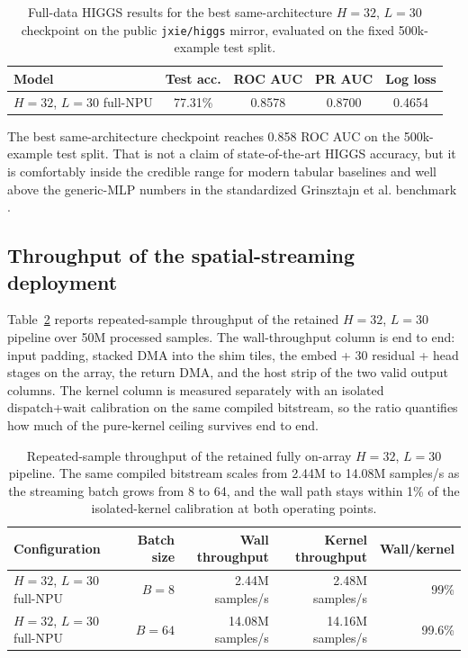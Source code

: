 \documentclass[a4paper,11pt]{article}
\newcommand{\code}[1]{\texttt{#1}}
\begin{document}
\begin{table}[t]
\centering
\footnotesize
\begin{tabular}{@{}lcccc@{}}
\toprule
Model & Test acc. & ROC AUC & PR AUC & Log loss \\
\midrule
$H=32$, $L=30$ full-NPU & 77.31\% & 0.8578 & 0.8700 & 0.4654 \\
\bottomrule
\end{tabular}
\caption{Full-data HIGGS results for the best same-architecture $H=32$, $L=30$
checkpoint on the public \code{jxie/higgs} mirror, evaluated on the fixed
500k-example test split.}
\label{tab:higgs-full-results}
\end{table}

The best same-architecture checkpoint reaches 0.858 ROC AUC on the
500k-example test split.
That is not a claim of state-of-the-art HIGGS accuracy, but it is comfortably
inside the credible range for modern tabular baselines and well above the
generic-MLP numbers in the standardized Grinsztajn et al. benchmark
\cite{baldi-higgs,grinsztajn-tabular}.

\subsection{Throughput of the spatial-streaming deployment}

Table~\ref{tab:higgs-throughput} reports repeated-sample throughput of the
retained $H=32$, $L=30$ pipeline over 50M processed samples. The wall-throughput
column is end to end: input padding, stacked DMA into the shim tiles, the
embed + 30 residual + head stages on the array, the return DMA, and the host
strip of the two valid output columns. The kernel column is measured separately
with an isolated dispatch+wait calibration on the same compiled bitstream, so
the ratio quantifies how much of the pure-kernel ceiling survives end to end.

\begin{table}[t]
\centering
\small
\begin{tabular}{@{}lrrrr@{}}
\toprule
Configuration & Batch size & Wall throughput & Kernel throughput & Wall/kernel \\
\midrule
$H=32$, $L=30$ full-NPU & $B=8$  & 2.44M samples/s & 2.48M samples/s & 99\% \\
$H=32$, $L=30$ full-NPU & $B=64$ & 14.08M samples/s & 14.16M samples/s & 99.6\% \\
\bottomrule
\end{tabular}
\caption{Repeated-sample throughput of the retained fully on-array
$H=32$, $L=30$ pipeline. The same compiled bitstream scales from 2.44M to
14.08M samples/s as the streaming batch grows from 8 to 64, and the wall path
stays within 1\% of the isolated-kernel calibration at both operating points.}
\label{tab:higgs-throughput}
\end{table}
\end{document}
